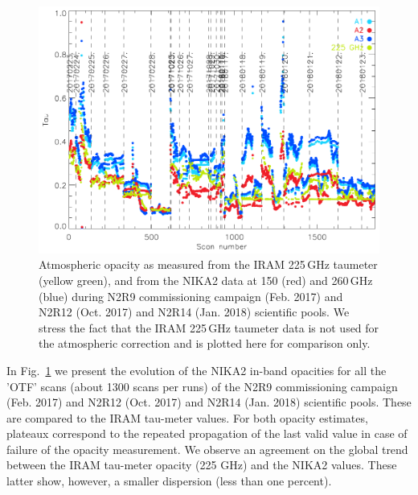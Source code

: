 \begin{figure}[ht]
\begin{center}
\includegraphics[scale=1.0]{Figures/opacity_evol_run_9_12_14.pdf}
\caption[Zenith opacity monitoring during N2R9, N2R12 and
  N2R14]{Atmospheric opacity as measured from the IRAM 225\,GHz
  taumeter (yellow green), and from the NIKA2 data at 150 (red) and
  260\,GHz (blue) during N2R9 commissioning campaign (Feb. 2017) and
  N2R12 (Oct. 2017) and N2R14 (Jan. 2018) scientific pools. We
  stress the fact that the IRAM 225\,GHz taumeter data is not used for
  the atmospheric correction and is plotted here for comparison only.
  \label{fig:taumeas}}
\end{center}
\end{figure}




In Fig.~\ref{fig:taumeas}  we present the evolution of the NIKA2 in-band
opacities for all the 'OTF' scans (about 1300 scans per runs) of the
N2R9 commissioning campaign (Feb. 2017) and N2R12 (Oct. 2017) and
N2R14 (Jan. 2018) scientific pools. These are compared to the IRAM
tau-meter values. For both opacity estimates, plateaux correspond to
the repeated propagation of the last valid value in case of failure of
the opacity measurement. We observe an agreement on the
global trend between the IRAM tau-meter opacity (225 GHz) and the
NIKA2 values. These latter show, however, a smaller dispersion (less
than one percent).



